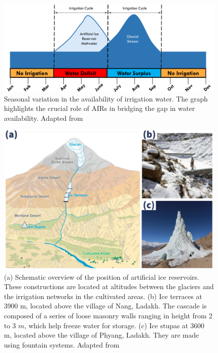 \begin{figure}[htb]
\centering
\includegraphics[width=\textwidth]{figs/irrigation_cycles.png}
\caption{Seasonal variation in the availability of irrigation water. The graph highlights the crucial role of
\ac{AIRs} in bridging the gap in water availability. Adapted from \cite{nusserLocalKnowledgeGlobal2016}}
\label{fig:irrigation_cycles}
\end{figure}

\begin{figure}[t]
\centering
\includegraphics[width=\textwidth]{figs/AIR_forms.jpg}

\caption{(a) Schematic overview of the position of artificial ice reservoirs. These constructions are located at
  altitudes between the glaciers and the irrigation networks in the cultivated areas. (b) Ice terraces at 3900
  m, located above the village of Nang, Ladakh. The cascade is composed of a series of loose masonry walls
  ranging in height from 2 to 3 $m$, which help freeze water for storage. (c) Ice stupas at 3600 m, located
above the village of Phyang, Ladakh. They are made using fountain systems. Adapted from
\cite{nusserLocalKnowledgeGlobal2016}}

\label{fig:AIRforms}
\end{figure}

